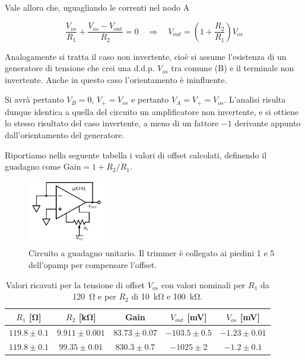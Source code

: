 Vale allora che, uguagliando le correnti nel nodo A

$$\frac{V_{os}}{R_1} + \frac{V_{os}-V_{out}}{R_2} = 0 \quad \Rightarrow \quad V_{out}=\left(1+\frac{R_2}{R_1}\right) V_{os}$$

Analogamente si tratta il caso non invertente, cioè si assume l'esistenza di un generatore di tensione che crei una d.d.p. $V_{os}$ tra comune (B) e il terminale non invertente.
Anche in questo caso l'orientamento è ininfluente.

Si avrà pertanto $V_B=0$, $V_+=V_{os}$ e pertanto $V_A=V_+=V_{os}$.
L'analisi risulta dunque identica a quella del circuito un amplificatore non invertente, e si ottiene lo stesso risultato del caso invertente, a meno di un fattore $-1$ derivante appunto dall'orientamento del generatore.

Riportiamo nella seguente tabella i valori di offset calcolati, definendo il guadagno come Gain$=1+R_2/R_1$.

\begin{figure}
  \caption{Circuito a guadagno unitario. Il trimmer è collegato ai piedini 1 e 5 dell'opamp per compensare l'offset.}
  \begin{center}
  \includegraphics[width=0.30\textwidth]{../E02/latex/trimmer_correction.pdf}
  \end{center}
  \label{cir2:trimmer}
\end{figure}

\begin{table}[h]
\begin{center}
\begin{savenotes}
\begin{minipage}[c]{0.7\textwidth}
    {\renewcommand{\arraystretch}{1.2}%
	\begin{tabular}{c|c|c|c|c}
		$R_1$ [\si{\ohm}] & $R_2$ [\si{\kilo\ohm}] & Gain &$V_{out}$ [\si{\milli\volt}] & $V_{os}$ [\si{\milli\volt}]\\ 
		\hline 
		$119.8\pm0.1$ & $9.911\pm0.001$ & $83.73\pm0.07$&  $-103.5 \pm 0.5$ & $-1.23 \pm0.01$\\
		\hline
		$119.8\pm0.1$ & $99.35\pm0.01$ & $830.3\pm0.7$ &$ -1025 \pm 2$ & $-1.2 \pm0.1$\\
	\end{tabular}
    }
  \end{minipage}\hfill
  \begin{minipage}[c]{0.3\textwidth}
	\caption{Valori ricavati per la tensione di offset $V_{os}$ con valori nominali per $R_1$ da \SI{120}{\ohm} e per $R_2$ di \SI{10}{\kilo\ohm} e \SI{100}{\kilo\ohm}.}
	\label{tab2:vos}
  \end{minipage}
\end{savenotes}
\end{center}
\end{table}

